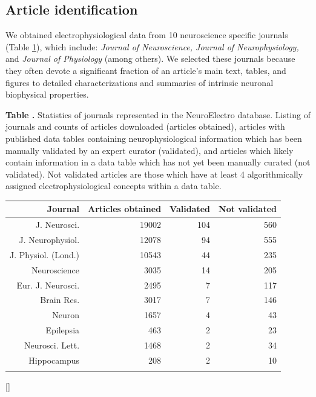 \documentclass{template/frontiersSCNS} %
\begin{document}
\subsection{Article identification}
We obtained electrophysiological data from 10 neuroscience specific journals (Table \ref{tab:journal_listing}), which include: \emph{Journal of Neuroscience, Journal of Neurophysiology,} and \emph{Journal of Physiology} (among others). 
We selected these journals because they often devote a significant fraction of an article's main text, tables, and figures to detailed characterizations and summaries of intrinsic neuronal biophysical properties. 

\begin{table}[!t]
\textbf{\label{tab:journal_listing} Table .}
{Statistics of journals represented in the NeuroElectro database. Listing of journals and counts of articles downloaded (articles obtained), articles with published data tables containing neurophysiological information which has been manually validated by an expert curator (validated), and articles which likely contain information in a data table which has not yet been manually curated (not validated). 
Not validated articles are those which have at least 4 algorithmically assigned electrophysiological concepts within a data table.}
\processtable{}
{\begin{tabular}{rrrr}
    \toprule
    Journal & Articles obtained & Validated & Not validated \\
    \midrule
    J. Neurosci. & 19002 & 104   & 560 \\
    J. Neurophysiol. & 12078 & 94    & 555 \\
    J. Physiol. (Lond.) & 10543 & 44    & 235 \\
    Neuroscience & 3035  & 14    & 205 \\
    Eur. J. Neurosci. & 2495  & 7     & 117 \\
    Brain Res. & 3017  & 7     & 146 \\
    Neuron & 1657  & 4     & 43 \\
    Epilepsia & 463   & 2     & 23 \\
    Neurosci. Lett. & 1468  & 2     & 34 \\
    Hippocampus & 208   & 2     & 10 \\
    \botrule
    \end{tabular}}[]
\end{table}
\end{document}
